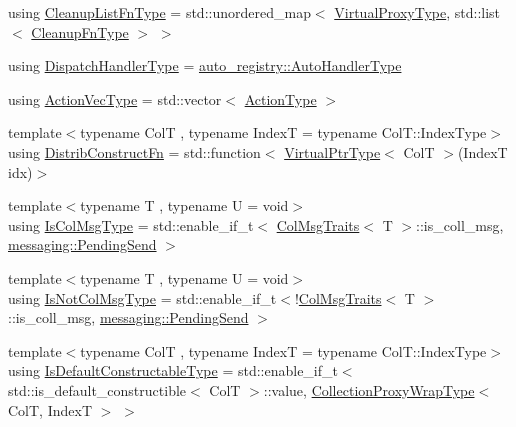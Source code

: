 \begin{DoxyCompactItemize}
using \hyperlink{structvt_1_1vrt_1_1collection_1_1_collection_manager_a735e54bc5a8646536d07750e2549a156}{Cleanup\+List\+Fn\+Type} = std\+::unordered\+\_\+map$<$ \hyperlink{namespacevt_a1b417dd5d684f045bb58a0ede70045ac}{Virtual\+Proxy\+Type}, std\+::list$<$ \hyperlink{structvt_1_1vrt_1_1collection_1_1_collection_manager_a95c122e5b83bc51c306c9367b8e62c07}{Cleanup\+Fn\+Type} $>$ $>$
\item 
using \hyperlink{structvt_1_1vrt_1_1collection_1_1_collection_manager_a0cfe02a0426e95ec9daa2ef7374e07c7}{Dispatch\+Handler\+Type} = \hyperlink{namespacevt_1_1auto__registry_ae295e18699146815bb7d7674594d95d7}{auto\+\_\+registry\+::\+Auto\+Handler\+Type}
\item 
using \hyperlink{structvt_1_1vrt_1_1collection_1_1_collection_manager_a51650235f0e53ae08381942eba822679}{Action\+Vec\+Type} = std\+::vector$<$ \hyperlink{namespacevt_ae0a5a7b18cc99d7b732cb4d44f46b0f3}{Action\+Type} $>$
\item 
{\footnotesize template$<$typename ColT , typename IndexT  = typename Col\+T\+::\+Index\+Type$>$ }\\using \hyperlink{structvt_1_1vrt_1_1collection_1_1_collection_manager_a7503830bc133013d542856fa39834dcc}{Distrib\+Construct\+Fn} = std\+::function$<$ \hyperlink{structvt_1_1vrt_1_1collection_1_1_collection_manager_a1da9015e52d6ecca955f57b59aab0b82}{Virtual\+Ptr\+Type}$<$ ColT $>$(IndexT idx)$>$
\item 
{\footnotesize template$<$typename T , typename U  = void$>$ }\\using \hyperlink{structvt_1_1vrt_1_1collection_1_1_collection_manager_a21c21612c806016788057aeab142af20}{Is\+Col\+Msg\+Type} = std\+::enable\+\_\+if\+\_\+t$<$ \hyperlink{structvt_1_1vrt_1_1collection_1_1_col_msg_traits}{Col\+Msg\+Traits}$<$ T $>$\+::is\+\_\+coll\+\_\+msg, \hyperlink{structvt_1_1messaging_1_1_pending_send}{messaging\+::\+Pending\+Send} $>$
\item 
{\footnotesize template$<$typename T , typename U  = void$>$ }\\using \hyperlink{structvt_1_1vrt_1_1collection_1_1_collection_manager_ae376deeefd4f89a0b1c93849977715d9}{Is\+Not\+Col\+Msg\+Type} = std\+::enable\+\_\+if\+\_\+t$<$!\hyperlink{structvt_1_1vrt_1_1collection_1_1_col_msg_traits}{Col\+Msg\+Traits}$<$ T $>$\+::is\+\_\+coll\+\_\+msg, \hyperlink{structvt_1_1messaging_1_1_pending_send}{messaging\+::\+Pending\+Send} $>$
\item 
{\footnotesize template$<$typename ColT , typename IndexT  = typename Col\+T\+::\+Index\+Type$>$ }\\using \hyperlink{structvt_1_1vrt_1_1collection_1_1_collection_manager_af8091fcb8218dad155ea028c9b5d283f}{Is\+Default\+Constructable\+Type} = std\+::enable\+\_\+if\+\_\+t$<$ std\+::is\+\_\+default\+\_\+constructible$<$ ColT $>$\+::value, \hyperlink{structvt_1_1vrt_1_1collection_1_1_collection_manager_a56458ed7f9bb22b631b9b3a745f42f94}{Collection\+Proxy\+Wrap\+Type}$<$ ColT, IndexT $>$ $>$

\end{DoxyCompactItemize}
